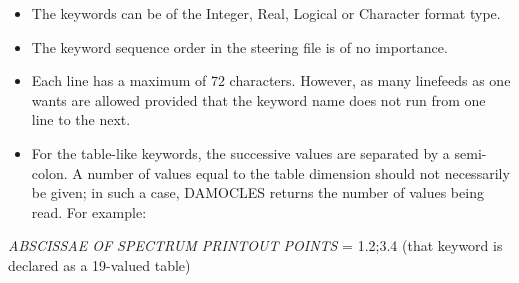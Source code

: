 \begin{itemize}
\item  The keywords can be of the Integer, Real, Logical or Character format type.

\item  The keyword sequence order in the steering file is of no importance.

\item  Each line has a maximum of 72 characters. However, as many linefeeds as one wants are allowed provided that the keyword name does not run from one line to the next.

\item  For the table-like keywords, the successive values are separated by a semi-colon. A number of values equal to the table dimension should not necessarily be given; in such a case, DAMOCLES returns the number of values being read. For example:
\end{itemize}

\textit{ABSCISSAE OF SPECTRUM PRINTOUT POINTS }= 1.2;3.4   (that keyword is declared as a 19-valued table)

